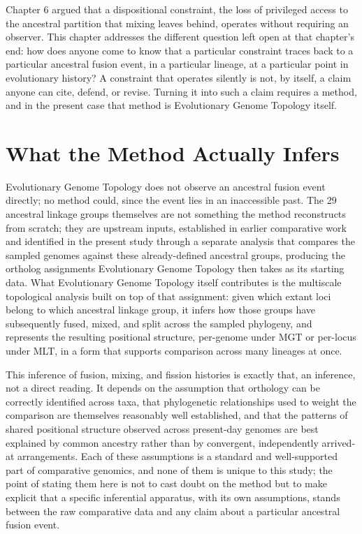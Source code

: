 \documentclass[11pt]{book}
\begin{document}
Chapter 6 argued that a dispositional constraint, the loss of privileged access to the ancestral partition that mixing leaves behind, operates without requiring an observer. This chapter addresses the different question left open at that chapter's end: how does anyone come to know that a particular constraint traces back to a particular ancestral fusion event, in a particular lineage, at a particular point in evolutionary history? A constraint that operates silently is not, by itself, a claim anyone can cite, defend, or revise. Turning it into such a claim requires a method, and in the present case that method is Evolutionary Genome Topology itself.

\section{What the Method Actually Infers}

Evolutionary Genome Topology does not observe an ancestral fusion event directly; no method could, since the event lies in an inaccessible past. The 29 ancestral linkage groups themselves are not something the method reconstructs from scratch; they are upstream inputs, established in earlier comparative work and identified in the present study through a separate analysis that compares the sampled genomes against these already-defined ancestral groups, producing the ortholog assignments Evolutionary Genome Topology then takes as its starting data. What Evolutionary Genome Topology itself contributes is the multiscale topological analysis built on top of that assignment: given which extant loci belong to which ancestral linkage group, it infers how those groups have subsequently fused, mixed, and split across the sampled phylogeny, and represents the resulting positional structure, per-genome under MGT or per-locus under MLT, in a form that supports comparison across many lineages at once.

This inference of fusion, mixing, and fission histories is exactly that, an inference, not a direct reading. It depends on the assumption that orthology can be correctly identified across taxa, that phylogenetic relationships used to weight the comparison are themselves reasonably well established, and that the patterns of shared positional structure observed across present-day genomes are best explained by common ancestry rather than by convergent, independently arrived-at arrangements. Each of these assumptions is a standard and well-supported part of comparative genomics, and none of them is unique to this study; the point of stating them here is not to cast doubt on the method but to make explicit that a specific inferential apparatus, with its own assumptions, stands between the raw comparative data and any claim about a particular ancestral fusion event.
\end{document}
